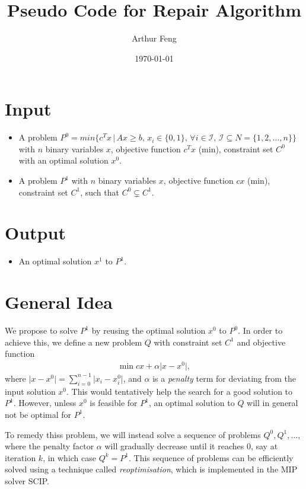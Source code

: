 \documentclass[11pt]{article}
\title{Pseudo Code for Repair Algorithm}
\author{Arthur Feng}
\date{\today}
\theoremstyle{definition}
\begin{document}
\maketitle

\section{Input}
\begin{itemize}
    \item A problem $P^0 = min \{ c^Tx\,|\, Ax \geq b,\, x_i \in \{0,1\},\, \forall i \in \mathcal{I}, \,\mathcal{I} \subseteq N = \{1,2,\dots,n \}   \}$ with $n$ binary variables $x$, objective function $c^T x$ (min), constraint set $C^0$ with an optimal solution $x^0$.
    \item A problem $P^1$ with $n$ binary variables $x$, objective function $c x$ (min), constraint set $C^1$, such that $C^0 \subsetneq C^1$.
\end{itemize}							

\section{Output}
\begin{itemize}	
    \item An optimal solution $x^1$ to $P^1$.
\end{itemize}

\section{General Idea}
We propose to solve $P^1$ by reusing the optimal solution $x^0$ to $P^0$.
In order to achieve this, we define a new problem $Q$ with constraint set $C^1$ and objective function
\begin{align*}
    \min c x + \alpha \lvert x - x^0 \rvert,					
\end{align*}
where $\lvert x - x^0 \rvert = \sum_{i=0}^{n-1}\lvert x_i - x^0_i \rvert$, and $\alpha$ is a \emph{penalty} term for deviating from the input solution $x^0$.
This would tentatively help the search for a good solution to $P^1$.
However, unless $x^0$ is feasible for $P^1$, an optimal solution to $Q$ will in general not be optimal for $P^1$.

To remedy thiss problem, we will instead solve a sequence of problems $Q^0, Q^1, \dots$, where the penalty factor $\alpha$ will gradually decrease until it reaches 0, say at iteration $k$, in which case $Q^k = P^1$.
This sequence of problems can be efficiently solved using a technique called \emph{reoptimisation}, which is implemented in the MIP solver SCIP.
\end{document}
